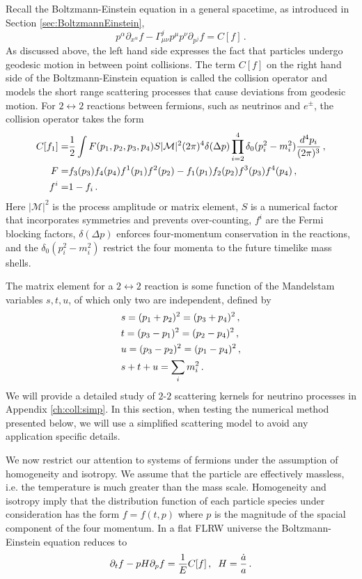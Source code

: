 Recall the  Boltzmann-Einstein equation in a general spacetime, as introduced in Section \ref{sec:BoltzmannEinstein},
\begin{equation}
p^\alpha\partial_{x^\alpha}f-\Gamma^j_{\mu\nu}p^\mu p^\nu\partial_{p^j}f=C[f]\,.
\end{equation}
As discussed above, the left hand side expresses the fact that particles undergo geodesic motion in between point collisions. The term $C[f]$ on the right hand side of the Boltzmann-Einstein equation is called the collision operator and models the short range scattering processes that cause deviations from geodesic motion. For $2\leftrightarrow 2$ reactions between fermions, such as neutrinos and $e^\pm$, the collision operator takes the form
\begin{align}\label{coll}
C[f_1]=&\frac{1}{2}\int F(p_1,p_2,p_3,p_4) S |\mathcal{M}|^2(2\pi)^4\delta(\Delta p)\prod_{i=2}^4\delta_0(p_i^2-m_i^2)\frac{d^4p_i}{(2\pi)^3}\,,\\
F=&f_3(p_3)f_4(p_4)f^1(p_1)f^2(p_2)-f_1(p_1)f_2(p_2)f^3(p_3)f^4(p_4)\,,\notag\\
f^i=&1- f_i\,.\notag
\end{align}
Here $|\mathcal{M}|^2$ is the process amplitude or matrix element, $S$ is a numerical factor that incorporates symmetries and prevents over-counting, $f^i$ are the Fermi blocking factors, $\delta(\Delta p)$ enforces four-momentum conservation in the reactions, and the $\delta_0(p_i^2-m_i^2)$ restrict the four momenta to the future timelike mass shells.


The matrix element for a $2\leftrightarrow2$ reaction is some function of the Mandelstam variables $s, t, u$, of which only two are independent, defined by
\begin{align}\label{Mandelstam}
&s=(p_1+p_2)^2=(p_3+p_4)^2\,,\\
&t=(p_3-p_1)^2=(p_2-p_4)^2\,,\notag\\
&u=(p_3-p_2)^2=(p_1-p_4)^2\,,\notag\\
&s+t+u=\sum_i m_i^2\,.\notag
\end{align}
We will provide a detailed study of $2$-$2$ scattering kernels for neutrino processes in Appendix \ref{ch:coll:simp}.  In this section, when testing the numerical method presented below, we will use a simplified scattering model to avoid any application specific details.

We now restrict our attention to  systems of fermions under the assumption of homogeneity and isotropy. We assume that the particle are effectively massless,  i.e. the temperature is much greater than the mass scale.  Homogeneity and isotropy imply that the distribution function of each particle species under consideration has the form $f=f(t,p)$ where $p$ is the magnitude of the spacial component of the four momentum.  In a flat FLRW universe the Boltzmann-Einstein equation reduces to
\begin{equation}\label{boltzmann:p}
\partial_t f-pH \partial_p f=\frac{1}{E}C[f]\,,\hspace{2mm} H=\frac{\dot{a}}{a}\,.
\end{equation}

